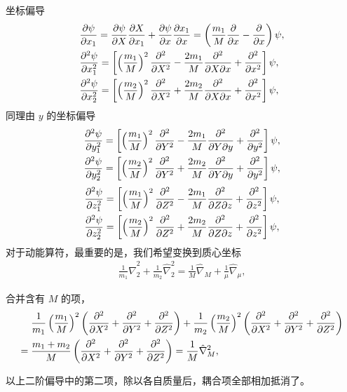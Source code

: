 坐标偏导
\begin{align}
    &\pdv{\psi}{x_1} = \pdv{\psi}{X} \pdv{X}{x_1} + \pdv{\psi}{x}\pdv{x_1}{x} =
    \left(\frac{m_1}{M} \pdv{x} - \pdv{x}\right)\psi, \\
    &\pdv[2]{\psi}{x_1} = 
    \left[
        \left(\frac {m_1}M\right)^2 \pdv[2]{X} - \frac{2m_1}{M} \pdv[2]{}{X}{x} + \pdv[2]{x}
    \right]\psi,
    \\
    &\pdv[2]{\psi}{x_2} = 
    \left[
        \left(\frac {m_2}M\right)^2 \pdv[2]{X} + \frac{2m_2}{M} \pdv[2]{}{X}{x} + \pdv[2]{x}
    \right]\psi,
\end{align}
同理由 $y$ 的坐标偏导
\begin{align}
    &\pdv[2]{\psi}{y_1} = 
    \left[
        \left(\frac {m_1}M\right)^2 \pdv[2]{Y} - \frac{2m_1}{M} \pdv[2]{}{Y}{y} + \pdv[2]{y}
    \right]\psi,
    \\
    &\pdv[2]{\psi}{y_2} = 
    \left[
        \left(\frac {m_2}M\right)^2 \pdv[2]{Y} + \frac{2m_2}{M} \pdv[2]{}{Y}{y} + \pdv[2]{y}
    \right]\psi,
\end{align}
\begin{align}
    &\pdv[2]{\psi}{z_1} = 
    \left[
        \left(\frac {m_1}M\right)^2 \pdv[2]{Z} - \frac{2m_1}{M} \pdv[2]{}{Z}{z} + \pdv[2]{z}
    \right]\psi,
    \\
    &\pdv[2]{\psi}{z_2} = 
    \left[
        \left(\frac {m_2}M\right)^2 \pdv[2]{Z} + \frac{2m_2}{M} \pdv[2]{}{Z}{z} + \pdv[2]{z}
    \right]\psi,
\end{align}
对于动能算符，最重要的是，我们希望变换到质心坐标
\begin{align}
    \frac1{m_1} \hat \nabla_2^2 + \frac1{m_2} \hat \nabla_2^2  = \frac1M \hat \nabla_M + \frac1{\mu} \hat \nabla_\mu,
\end{align}

合并含有 $M$ 的项，
\begin{align}
    &\frac 1{m_1} 
    \left(\frac{m_1}M\right)^2
    \left(
        \pdv[2]{X} + \pdv[2]{Y} + \pdv[2]{Z}
    \right) 
    + \frac1{m_2} 
    \left(\frac{m_2}M\right)^2 
    \left(
        \pdv[2]{X} + \pdv[2]{Y} + \pdv[2]{Z}
    \right) \notag \\
     = {}&\frac{m_1 + m_2}{M} \left(
        \pdv[2]{X} + \pdv[2]{Y} + \pdv[2]{Z}
     \right) = \frac1M \hat \nabla_M^2,
\end{align}

以上二阶偏导中的第二项，除以各自质量后，耦合项全部相加抵消了。

